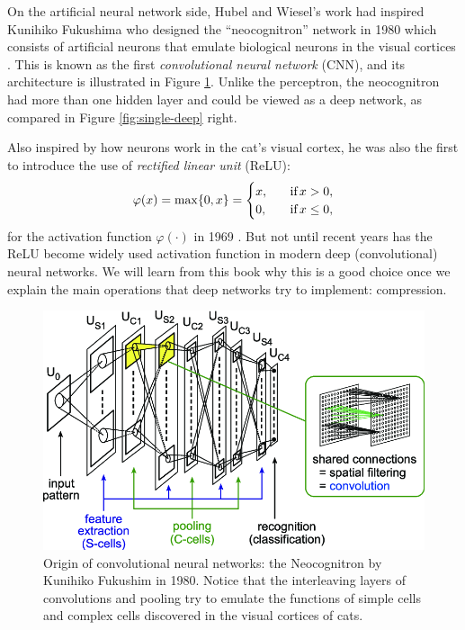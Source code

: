 \documentclass[../../book-main.tex]{subfiles}
\begin{document}
On the artificial neural network side, Hubel and Wiesel's work had inspired Kunihiko Fukushima who  designed the ``neocognitron'' network in 1980 which consists of artificial neurons that emulate biological neurons in the visual cortices \cite{Fukushima1980NeocognitronAS}. This is known as the first {\em convolutional neural network} (CNN), and its architecture is illustrated in Figure \ref{fig:neocognitron}. Unlike the perceptron, the neocognitron had more than one hidden layer and could be viewed as a deep network, as compared in Figure \ref{fig:single-deep} right.

Also inspired by how neurons work in the cat's visual cortex, he was also the first to introduce the use of {\em rectified linear unit} (ReLU):
\begin{equation}
    \varphi(x) = \max\{0, x\} = \begin{cases}x, & \text{if} \, x > 0, \\ 0, \quad & \text{if} \, x \leq 0,\end{cases}
\end{equation}
for the activation function $\varphi(\cdot)$ in 1969 \cite{Fukushima-1969}. But not until recent years has the ReLU become widely used activation function in modern deep (convolutional) neural networks. We will learn from this book why this is a good choice once we explain the main operations that deep networks try to implement: compression. 

\begin{figure}
    \centering
    \includegraphics[width=0.6\linewidth]{figures/neocognitron.png}
    \caption{Origin of convolutional neural networks: the Neocognitron by Kunihiko Fukushim in 1980. Notice that the interleaving layers of convolutions and pooling try to emulate the functions of simple cells and complex cells discovered in the visual cortices of cats.}
    \label{fig:neocognitron}
\end{figure}
\end{document}

